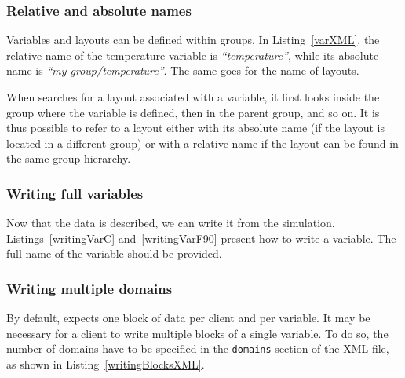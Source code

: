 \subsubsection{Relative and absolute names}

Variables and layouts can be defined within groups. In Listing~\ref{varXML}, the relative name of the 
temperature variable is \emph{``temperature''}, while its absolute name is \emph{``my group/temperature''}.
The same goes for the name of layouts.

When \Damaris{} searches for a layout associated with a variable, it first looks inside
the group where the variable is defined, then in the parent group, and so on. It is thus possible to
refer to a layout either with its absolute name (if the layout is located in a different group) or
with a relative name if the layout can be found in the same group hierarchy.

\subsubsection{Writing full variables}

Now that the data is described, we can write it from the simulation. 
Listings~\ref{writingVarC} and~\ref{writingVarF90} present how to write a variable. 
The full name of the variable should be provided.

\noindent\begin{minipage}{\textwidth}
\vspace{0.5cm}

\end{minipage}

\noindent\begin{minipage}{\textwidth}

\end{minipage}

\subsubsection{Writing multiple domains}

By default, \Damaris{} expects one block of data per client and per variable.
It may be necessary for a client to write multiple blocks of a single variable. 
To do so, the number of domains have to be specified in the \texttt{domains} section of the 
XML file, as shown in Listing~\ref{writingBlocksXML}.


